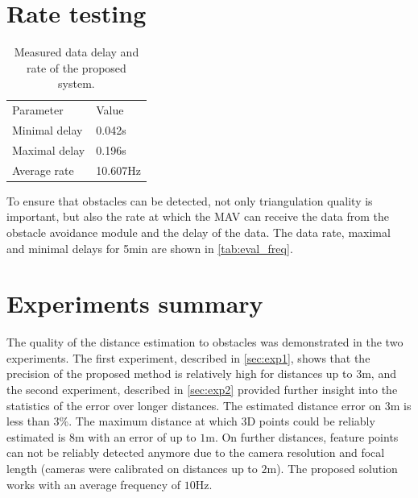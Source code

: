 \section{Rate testing}
\begin{table}[ht]
    \begin{center}
      \begin{tabular}{ll}
      \hline
        Parameter & Value \\
        Minimal delay &  0.042s \\
        Maximal delay &  0.196s \\
        Average rate & 10.607Hz \\ 
      \end{tabular}
    \end{center}
    \caption{Measured data delay and rate of the proposed system.}
    \label{tab:eval_freq}
\end{table}

To ensure that obstacles can be detected, not only triangulation quality is important, but also the rate at which the MAV can receive the data from the obstacle avoidance module and the delay of the data.
The data rate, maximal and minimal delays for 5min are shown in \autoref{tab:eval_freq}.
 
\section{Experiments summary}
The quality of the distance estimation to obstacles was demonstrated in the two experiments.
The first experiment, described in \autoref{sec:exp1}, shows that the precision of the proposed method is relatively high for distances up to 3m, and the second experiment, described in \autoref{sec:exp2} provided further insight into the statistics of the error over longer distances. 
The estimated distance error on $3$m is less than $3\%$.
The maximum distance at which 3D points could be reliably estimated is $8$m with an error of up to $1$m.
On further distances, feature points can not be reliably detected anymore due to the camera resolution and focal length (cameras were calibrated on distances up to $2$m).
The proposed solution works with an average frequency of $10$Hz.
